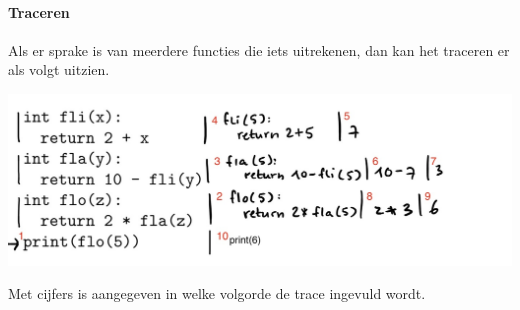 \paragraph{Traceren} Als er sprake is van meerdere functies die iets uitrekenen, dan kan het traceren er als volgt uitzien.

\includegraphics[width=.9\textwidth]{7-trace-multi-returns.jpeg}

Met cijfers is aangegeven in welke volgorde de trace ingevuld wordt.
